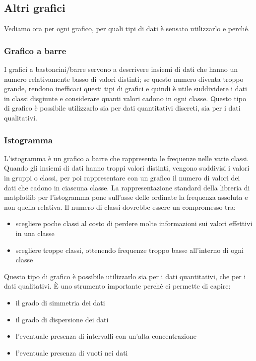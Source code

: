 \subsection{Altri grafici}
Vediamo ora per ogni grafico, per quali tipi di dati è sensato utilizzarlo e perché.

\subsubsection{Grafico a barre}
I grafici a bastoncini/barre servono a descrivere insiemi di dati che hanno un numero relativamente basso di valori distinti; se questo numero diventa troppo grande, rendono inefficaci questi tipi di grafici e quindi è utile suddividere i dati in classi disgiunte e considerare quanti valori cadono in ogni classe. Questo tipo di grafico è possibile utilizzarlo sia per dati quantitativi discreti, sia per i dati qualitativi.

\subsubsection{Istogramma}
L'istogramma è un grafico a barre che rappresenta le frequenze nelle varie classi. Quando gli insiemi di dati hanno troppi valori distinti, vengono suddivisi i valori in gruppi o classi, per poi rappresentare con un grafico il numero di valori dei dati che cadono in ciascuna classe. La rappresentazione standard della libreria di matplotlib per l'istogramma pone sull'asse delle ordinate la frequenza assoluta e non quella relativa. Il numero di classi dovrebbe essere un compromesso tra:
\begin{itemize}
    \item scegliere poche classi al costo di perdere molte informazioni sui valori effettivi in una classe
    \item scegliere troppe classi, ottenendo frequenze troppo basse all'interno di ogni classe
\end{itemize}

\noindent Questo tipo di grafico è possibile utilizzarlo sia per i dati quantitativi, che per i dati qualitativi. È uno strumento importante perché ci permette di capire:
\begin{itemize}
    \item il grado di simmetria dei dati
    \item il grado di dispersione dei dati
    \item l'eventuale presenza di intervalli con un'alta concentrazione
    \item l'eventuale presenza di vuoti nei dati
\end{itemize}

